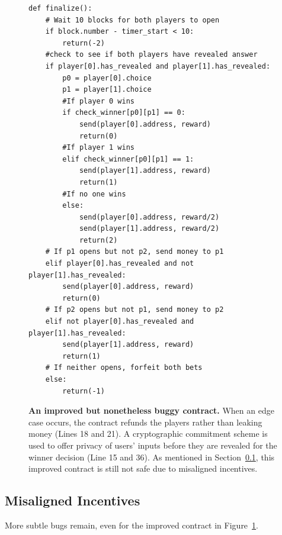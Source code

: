 \documentclass{llncs}
\begin{document}
\begin{figure}
\begin{minipage}{\columnwidth}%
\begin{mdframed}
\begin{verbatim}
def finalize():
	# Wait 10 blocks for both players to open
	if block.number - timer_start < 10: 
		return(-2)
	#check to see if both players have revealed answer
	if player[0].has_revealed and player[1].has_revealed:
		p0 = player[0].choice
		p1 = player[1].choice
		#If player 0 wins
		if check_winner[p0][p1] == 0:
			send(player[0].address, reward)
			return(0)
		#If player 1 wins
		elif check_winner[p0][p1] == 1:
			send(player[1].address, reward)
			return(1)
		#If no one wins
		else:
			send(player[0].address, reward/2)
			send(player[1].address, reward/2)
			return(2)
	# If p1 opens but not p2, send money to p1
	elif player[0].has_revealed and not player[1].has_revealed:
		send(player[0].address, reward)
		return(0)
	# If p2 opens but not p1, send money to p2
	elif not player[0].has_revealed and player[1].has_revealed:
		send(player[1].address, reward)
		return(1)
	# If neither opens, forfeit both bets
	else:
		return(-1)
\end{verbatim}
\end{mdframed}
\end{minipage}%
%
\caption{
\label{fig:nocrypto}
{\bf An improved but nonetheless buggy contract.} 
When an edge case occurs, the contract refunds the players rather than leaking money (Lines 18 and 21). 
A cryptographic commitment scheme is used
to offer privacy of users' inputs before 
they are revealed for the winner decision (Line 15 and 36).
As mentioned in Section~\ref{sec:incentive}, 
this improved contract is still not safe  
due to misaligned incentives.
}
\end{figure}

\subsection{Misaligned Incentives}
\label{sec:incentive}
More subtle bugs remain, even for the improved contract in Figure~\ref{fig:nocrypto}.
\end{document}
